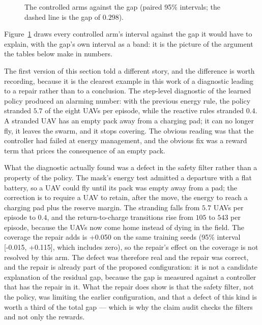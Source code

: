 \documentclass[conference]{IEEEtran}
\newcommand{\tokGap}{0.298}
\begin{document}
\begin{figure}[t]
{%
}
\caption{The controlled arms against the gap (paired 95\% intervals; the dashed line is the gap of $\tokGap$).}
\label{fig:arms}
\end{figure}

Figure~\ref{fig:arms} draws every controlled arm's interval against the gap it would have to explain, with the gap's own interval as a band: it is the picture of the argument the tables below make in numbers.

The first version of this section told a different story, and the
difference is worth recording, because it is the clearest example in this
work of a diagnostic leading to a repair rather than to a conclusion.  The
step-level diagnostic of the learned policy produced an alarming number:
with the previous energy rule, the policy stranded $5.7$ of the
eight UAVs per episode, while the reactive rules stranded $0.4$.  A
stranded UAV has an empty pack away from a charging pad; it can no longer
fly, it leaves the swarm, and it stops covering.  The obvious reading was
that the controller had failed at energy management, and the obvious fix
was a reward term that prices the consequence of an empty pack.

What the diagnostic actually found was a defect in the safety filter rather
than a property of the policy.  The mask's energy test admitted a
departure with a flat battery, so a UAV could fly until its pack was empty
away from a pad; the correction is to require a UAV to retain, after the
move, the energy to reach a charging pad plus the reserve margin.  The
stranding falls from $5.7$ UAVs per episode to $0.4$, and
the return-to-charge transitions rise from $105$ to $543$ per
episode, because the UAVs now come home instead of dying in the field.
The coverage the repair adds is +0.050 on the same training seeds (95\% interval [-0.015, +0.115], which includes zero), so the repair's effect on the coverage is not resolved by this arm.  The defect was therefore real and the repair was
correct, and the repair is already part of the proposed configuration: it
is not a candidate explanation of the residual gap, because the gap is
measured against a controller that has the repair in it.  What the repair
does show is that the safety filter, not the policy, was limiting the
earlier configuration, and that a defect of this kind is worth a third of
the total gap --- which is why the claim audit checks the filters and not
only the rewards.
\end{document}
